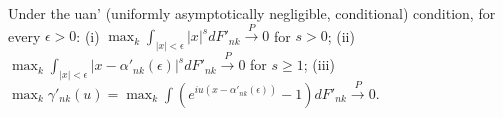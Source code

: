 Under the uan' (uniformly asymptotically negligible, conditional) condition, for every $\epsilon > 0$: (i) $\max_k \int_{|x| < \epsilon} |x|^s dF'_{nk} \xrightarrow{P} 0$ for $s > 0$; (ii) $\max_k \int_{|x| < \epsilon} |x - \alpha'_{nk}(\epsilon)|^s dF'_{nk} \xrightarrow{P} 0$ for $s \geq 1$; (iii) $\max_k \gamma'_{nk}(u) = \max_k \int(e^{iu(x - \alpha'_{nk}(\epsilon))} - 1) dF'_{nk} \xrightarrow{P} 0$.
